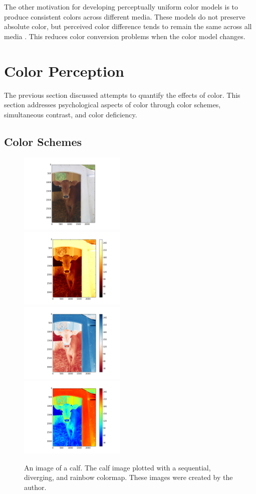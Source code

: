 \documentclass[journal,12pt]{IEEEtran}
\begin{document}
The other motivation for developing perceptually
uniform color models is to produce consistent colors across different media.
These models do not preserve absolute color, but perceived color difference tends
to remain the same across all media \cite{ciecam02}.
This reduces color conversion problems when the color model changes.

\section{Color Perception}

The previous section discussed attempts to quantify the effects of color.
This section addresses psychological aspects of color through color schemes,
simultaneous contrast, and color deficiency.

\subsection{Color Schemes}

\begin{figure}
\centering
\includegraphics[width=2in]{calf_original} \\
\includegraphics[width=2in]{calf_sequential} \\
\includegraphics[width=2in]{calf_diverging} \\
\includegraphics[width=2in]{calf_rainbow} \\
\caption{An image of a calf. The calf image plotted with a
sequential, diverging, and rainbow colormap. These images were created by the author.}
\end{figure}
\end{document}

